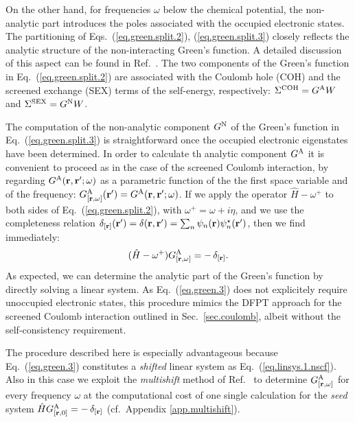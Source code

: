 \documentclass[twocolumn,prb,showpacs,superscriptaddress]{revtex4}
\def\w{\omega}
\def\H{\hat{H}}
\def\r{{\bf r}}
\def\rp{{\bf r^\prime}}
\begin{document}
On the other hand, for frequencies $\w$
below the chemical potential, the non-analytic part introduces the poles associated with the occupied 
electronic states. 
The partitioning of Eqs.\ (\ref{eq.green.split.2}),
(\ref{eq.green.split.3}) closely reflects the analytic structure
of the non-interacting Green's function.
A detailed discussion of this aspect can be found in Ref.\ .
The two components of the Green's function in Eq.\ (\ref{eq.green.split.2}) 
are associated with the Coulomb hole (COH) and the screened exchange (SEX) terms of the
self-energy, respectively:\cite{hl86} 
$\Sigma^{\rm COH} = G^{\rm A} W$  and $\Sigma^{\rm SEX} = G^{\rm N} W$.

The computation of the non-analytic component $G^{\rm N}$ of the
Green's function in Eq.\ (\ref{eq.green.split.3}) is straightforward 
once the occupied electronic eigenstates have been determined.
In order to calculate th analytic component $G^{\rm A}$ it is convenient to
proceed as in the case of the screened Coulomb interaction,
by regarding $G^{\rm A}(\r,\rp;\w)$ as a parametric
function of the the first space variable and of the frequency:
$G^{\rm A}_{[\r,\w]}(\rp) = G^{\rm A}(\r,\rp;\w)$.
If we apply the operator $\H-\w^+$ to both sides of Eq.\ (\ref{eq.green.split.2}),
with $\w^+=\w+i\eta$,
and we use the completeness relation $\delta_{[\r]}(\rp) = \delta(\r,\rp) = \sum_n \psi_n(\r)\psi_n^\star(\rp)$, then we find immediately:
  \begin{equation}\label{eq.green.3}
  (\H-\w^+) G^{\rm A}_{[\r,\w]} = -\, \delta_{[\r]}.
  \end{equation}
As expected, we can determine the analytic part of the Green's function
by directly solving a linear system. As Eq.\ (\ref{eq.green.3}) 
does not explicitely require unoccupied electronic states, this procedure mimics 
the DFPT approach for the screened Coulomb interaction outlined in Sec.\ \ref{sec.coulomb},
albeit without the self-consistency requirement.

The procedure described here is especially advantageous because Eq.\ (\ref{eq.green.3})
constitutes a {\it shifted} linear system as Eq.\ (\ref{eq.linsys.1.nscf}).
Also in this case we exploit the {\it multishift} method of Ref.\ 
to determine $G^{\rm A}_{[\r,\w]}$ for every frequency $\w$
at the computational cost of one single calculation for the {\it seed} system $\H G^{\rm A}_{[\r,0]} = -\, \delta_{[\r]}$
(cf.\ Appendix \ref{app.multishift}).
\end{document}
